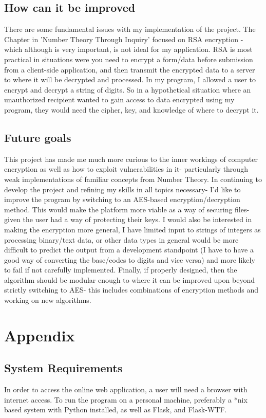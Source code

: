 \documentclass[a4paper]{article}
\begin{document}
\subsection{How can it be improved}
There are some fundamental issues with my implementation of the project. The Chapter in 'Number Theory Through Inquiry' focused on RSA encryption - which although is very important, is not ideal for my application. RSA is most practical in situations were you need to encrypt a form/data before submission from a client-side application, and then transmit the encrypted data to a server to where it will be decrypted and processed. In my program, I allowed a user to encrypt and decrypt a string of digits. So in a hypothetical situation where an unauthorized recipient wanted to gain access to data encrypted using my program, they would need the cipher, key, and knowledge of where to decrypt it.
\subsection{Future goals}
This project has made me much more curious to the inner workings of computer encryption as well as how to exploit vulnerabilities in it- particularly through weak implementations of familiar concepts from Number Theory. \newline
In continuing to develop the project and refining my skills in all topics necessary- I'd like to improve the program by switching to an AES-based encryption/decryption method. This would make the platform more viable as a way of securing files- given the user had a way of protecting their keys.
I would also be interested in making the encryption more general, I have limited input to strings of integers as processing binary/text data, or other data types in general would be more difficult to predict the output from a development standpoint (I have to have a good way of converting the base/codes to digits and vice versa) and more likely to fail if not carefully implemented. 
\newline
Finally, if properly designed, then the algorithm should be modular enough to where it can be improved upon beyond strictly switching to AES- this includes combinations of encryption methods and working on new algorithms.

\section{Appendix}
\subsection{System Requirements}
In order to access the online web application, a user will need a browser with internet access.
To run the program on a personal machine, preferably a *nix based system with Python installed, as well as Flask, and Flask-WTF.
\end{document}
